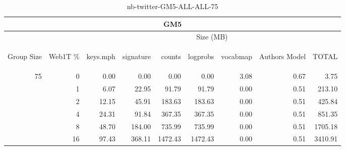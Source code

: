 \begin{center}
\begin{table}[htbp] 
 \begin{center}
\begin{tabular}{ | r | r | r | r | r | r | r | r | r |}
\hline
\multicolumn{9}{|c|}{GM5}\\
\hline
 & & \multicolumn{7}{|c|}{Size (MB)}\\ \cline{3-9}
\begin{sideways}Group Size\end{sideways} & \begin{sideways}Web1T \% \end{sideways} & \begin{sideways}keys.mph\end{sideways} & \begin{sideways}signature\end{sideways} & \begin{sideways}counts\end{sideways} & \begin{sideways}logprobs\end{sideways} & \begin{sideways}vocabmap\end{sideways} & \begin{sideways}Authors Model \end{sideways} & \begin{sideways}TOTAL\end{sideways}\\
\hline
\multirow{5}{*}{75}
 & 0 & 0.00 & 0.00 & 0.00 & 0.00 & 3.08 & 0.67 & 3.75\\ \cline{2-9}
 & 1 & 6.07 & 22.95 & 91.79 & 91.79 & 0.00 & 0.51 & 213.10\\ \cline{2-9}
 & 2 & 12.15 & 45.91 & 183.63 & 183.63 & 0.00 & 0.51 & 425.84\\ \cline{2-9}
 & 4 & 24.31 & 91.84 & 367.35 & 367.35 & 0.00 & 0.51 & 851.35\\ \cline{2-9}
 & 8 & 48.70 & 184.00 & 735.99 & 735.99 & 0.00 & 0.51 & 1705.18\\ \cline{2-9}
 & 16 & 97.43 & 368.11 & 1472.43 & 1472.43 & 0.00 & 0.51 & 3410.91\\ \cline{2-9}
\hline
\end{tabular}
\caption{nb-twitter-GM5-ALL-ALL-75}
\label{table:nb-twitter-GM5-ALL-ALL-75}
\end{center}
 \end{table}
\end{center}

